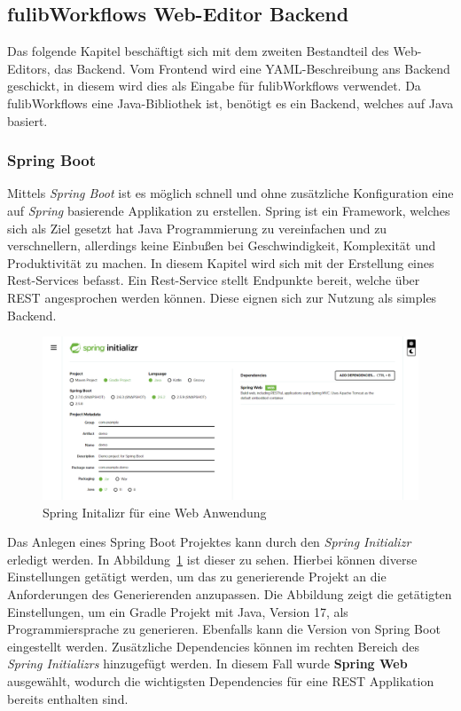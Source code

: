 \subsection{fulibWorkflows Web-Editor Backend}\label{subsec:backend}
Das folgende Kapitel beschäftigt sich mit dem zweiten Bestandteil des Web-Editors, das Backend.
Vom Frontend wird eine YAML-Beschreibung ans Backend geschickt, in diesem wird dies als Eingabe für fulibWorkflows verwendet.
Da fulibWorkflows eine Java-Bibliothek ist, benötigt es ein Backend, welches auf Java basiert.

\subsubsection{Spring Boot}
Mittels \textit{Spring Boot} ist es möglich schnell und ohne zusätzliche Konfiguration eine auf \textit{Spring} basierende Applikation zu erstellen.\cite*{springBoot}
Spring ist ein Framework, welches sich als Ziel gesetzt hat Java Programmierung zu vereinfachen und zu verschnellern, allerdings keine Einbußen
bei Geschwindigkeit, Komplexität und Produktivität zu machen.\cite*{spring}
In diesem Kapitel wird sich mit der Erstellung eines Rest-Services befasst.
Ein Rest-Service stellt Endpunkte bereit, welche über REST angesprochen werden können.
Diese eignen sich zur Nutzung als simples Backend.

\begin{figure}[h]
    \centering
    \includegraphics[width=1.0\textwidth]{images/2.2/spring-init}
    \caption{Spring Initalizr für eine Web Anwendung}
    \label{fig:spring-init}
\end{figure}


Das Anlegen eines Spring Boot Projektes kann durch den \textit{Spring Initializr} erledigt werden.\cite*{sbinit}
In Abbildung~\ref{fig:spring-init} ist dieser zu sehen.
Hierbei können diverse Einstellungen getätigt werden, um das zu generierende Projekt an die Anforderungen des Generierenden anzupassen.
Die Abbildung zeigt die getätigten Einstellungen, um ein Gradle Projekt mit Java, Version 17, als Programmiersprache zu generieren.
Ebenfalls kann die Version von Spring Boot eingestellt werden.
Zusätzliche Dependencies können im rechten Bereich des \textit{Spring Initializrs} hinzugefügt werden.
In diesem Fall wurde \textbf{Spring Web} ausgewählt, wodurch die wichtigsten Dependencies für eine REST Applikation bereits enthalten sind.

